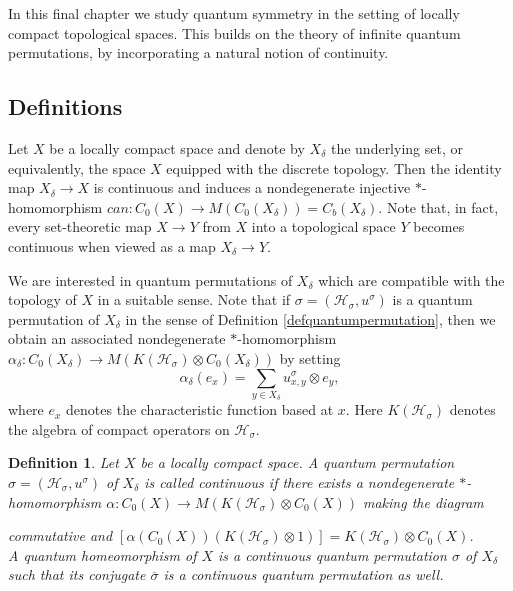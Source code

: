 \documentclass[a4paper]{amsart}
\newcommand*{\Hc}{\mathcal{H}}
\DeclareMathOperator{\id}{id}
\numberwithin{equation}{section}
\theoremstyle{change}
\newtheorem{definition}[theorem]{Definition}
\begin{document}
In this final chapter we study quantum symmetry in the setting of locally compact topological spaces. This builds on the theory of infinite quantum permutations, by incorporating a natural notion of continuity. 

\subsection{Definitions} 

Let $ X $ be a locally compact space and denote by $ X_\delta $ the underlying set, or equivalently, the space $ X $ equipped 
with the discrete topology. Then the identity map $ X_\delta \rightarrow X $ is continuous and induces a 
nondegenerate injective $ * $-homomorphism $ can: C_0(X) \rightarrow M(C_0(X_\delta)) = C_b(X_\delta) $. 
Note that, in fact, every set-theoretic map $ X \rightarrow Y $ from $ X $ into a topological space $ Y $ becomes continuous when viewed as 
a map $ X_\delta \rightarrow Y $. 

We are interested in quantum permutations of $ X_\delta $ which are compatible with the topology 
of $ X $ in a suitable sense. Note that if $ \sigma = (\Hc_\sigma, u^\sigma) $ is a quantum permutation of $ X_\delta $ in the sense of Definition \ref{defquantumpermutation}, then we 
obtain an associated  nondegenerate $ * $-homomorphism $ \alpha_\delta: C_0(X_\delta) \rightarrow M(K(\Hc_\sigma) \otimes C_0(X_\delta)) $ by setting 
$$ 
\alpha_\delta(e_x) = \sum_{y \in X_\delta} u^\sigma_{x, y} \otimes e_y, 
$$ 
where $ e_x $ denotes the characteristic function based at $ x $. Here $ K(\Hc_\sigma) $ denotes the algebra of compact operators on $ \Hc_\sigma $.  

\begin{definition} \label{qhomeo}
Let $ X $ be a locally compact space. A quantum permutation $ \sigma = (\Hc_\sigma, u^\sigma) $ of $ X_\delta $ is called continuous 
if there exists a nondegenerate $ * $-homomorphism $ \alpha: C_0(X) \rightarrow M(K(\Hc_\sigma) \otimes C_0(X)) $ making the diagram 
\begin{center}
\end{center}
commutative and $ [\alpha(C_0(X))(K(\Hc_\sigma) \otimes 1)] = K(\Hc_\sigma) \otimes C_0(X) $. \\
A quantum homeomorphism of $ X $ is a continuous quantum permutation $ \sigma $ of $ X_\delta $ such that its conjugate $ \overline{\sigma} $ is  
a continuous quantum permutation as well. 
\end{definition} 
\end{document}
